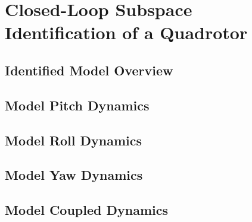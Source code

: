 \chapter{Closed-Loop Subspace Identification of a Quadrotor}

\section{Identified Model Overview}


\section{Model Pitch Dynamics}


\section{Model Roll Dynamics}


\section{Model Yaw Dynamics}


\section{Model Coupled Dynamics}
